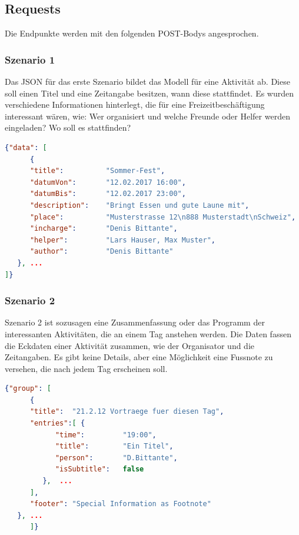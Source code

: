 \documentclass[main.tex]{subfiles}
\begin{document}
\subsection{Requests}
Die Endpunkte werden mit den folgenden POST-Bodys angesprochen. 


\subsubsection{Szenario 1}
Das JSON für das erste Szenario bildet das Modell für eine Aktivität ab. Diese soll einen Titel und eine Zeitangabe besitzen, wann diese stattfindet. Es wurden verschiedene Informationen hinterlegt, die für eine Freizeitbeschäftigung interessant wären, wie: Wer organisiert und welche Freunde oder Helfer werden eingeladen? Wo soll es stattfinden?  
\begin{lstlisting}[language=json,caption={JSON - Szenario 1},captionpos=b]
{"data": [
      {
      "title":          "Sommer-Fest",
      "datumVon":       "12.02.2017 16:00",
      "datumBis":       "12.02.2017 23:00",
      "description":    "Bringt Essen und gute Laune mit",
      "place":          "Musterstrasse 12\n888 Musterstadt\nSchweiz",
      "incharge":       "Denis Bittante",
      "helper":         "Lars Hauser, Max Muster",
      "author":         "Denis Bittante"
   }, ...
]}


\end{lstlisting}


\subsubsection{Szenario 2}
Szenario 2 ist sozusagen eine Zusammenfassung oder das Programm der interessanten Aktivitäten, die an einem Tag anstehen werden. Die Daten fassen die Eckdaten einer Aktivität zusammen, wie der Organisator und die Zeitangaben. Es gibt keine Details, aber eine Möglichkeit eine Fussnote zu versehen, die nach jedem Tag erscheinen soll. 
\begin{lstlisting}[language=json, caption={JSON - Szenario 2},captionpos=b]
{"group": [
      {
      "title":  "21.2.12 Vortraege fuer diesen Tag",
      "entries":[ {
            "time":         "19:00",
            "title":        "Ein Titel",
            "person":       "D.Bittante",
            "isSubtitle":   false
         },  ...
      ],
      "footer": "Special Information as Footnote"
   }, ...
      ]}


\end{lstlisting}
\end{document}
